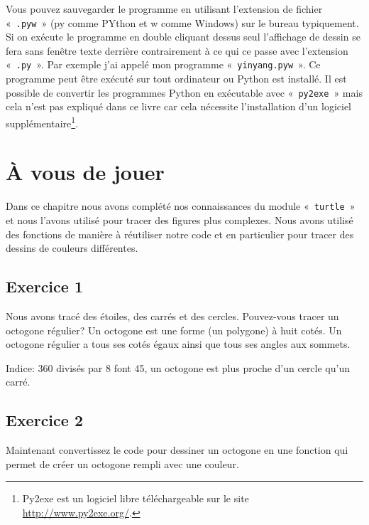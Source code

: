 Vous pouvez sauvegarder le programme en utilisant l'extension de fichier «~\texttt{.pyw}~» (py comme PYthon et w comme Windows) sur le bureau typiquement. Si on exécute le programme en double cliquant dessus seul l'affichage de dessin se fera sans fenêtre texte derrière contrairement à ce qui ce passe avec l'extension «~\texttt{.py}~». Par exemple j'ai appelé mon programme «~\texttt{yinyang.pyw}~». Ce programme peut être exécuté sur tout ordinateur ou Python est installé. Il est possible de convertir les programmes Python en exécutable avec «~\texttt{py2exe}~» mais cela n'est pas expliqué dans ce livre car cela nécessite l'installation d'un logiciel supplémentaire\footnote{Py2exe est un logiciel libre téléchargeable sur le site \url{http://www.py2exe.org/}.}.


\section{À vous de jouer}

Dans ce chapitre nous avons complété nos connaissances du module «~\texttt{turtle}~» et nous l'avons utilisé pour tracer des figures plus complexes. Nous avons utilisé des fonctions de manière à réutiliser notre code et en particulier pour tracer des dessins de couleurs différentes.

\subsection{Exercice 1}
Nous avons tracé des étoiles, des carrés et des cercles. Pouvez-vous tracer un octogone régulier? Un octogone est une forme (un polygone) à huit cotés. Un octogone régulier a tous ses cotés égaux ainsi que tous ses angles aux sommets.

Indice: 360 divisés par 8 font 45, un octogone est plus proche d'un cercle qu'un carré.

\subsection{Exercice 2}
Maintenant convertissez le code pour dessiner un octogone en une fonction qui permet de créer un octogone rempli avec une couleur.
